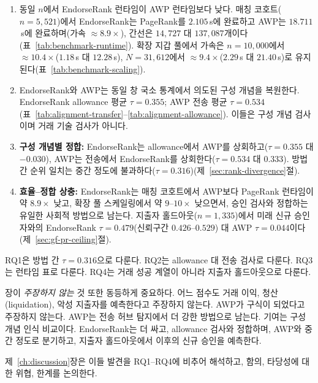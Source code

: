 \begin{enumerate}
\item[\textbf{C1.}] 동일 $n$에서 EndorseRank 런타임이 AWP 런타임보다 낮다. 매칭 코호트($n=5{,}521$)에서 EndorseRank는 PageRank를 $2.105$\,s에 완료하고 AWP는 $18.711$\,s에 완료하며(가속 $\approx 8.9\times$), 간선은 $14{,}727$ 대 $137{,}087$개이다(표~\ref{tab:benchmark-runtime}). 확장 지갑 풀에서 가속은 $n=10{,}000$에서 $\approx 10.4\times$($1.18$\,s 대 $12.28$\,s), $N=31{,}612$에서 $\approx 9.4\times$($2.29$\,s 대 $21.40$\,s)로 유지된다(표~\ref{tab:benchmark-scaling}).

\item[\textbf{C2.}] EndorseRank와 AWP는 동일 창 국소 통계에서 의도된 구성 개념을 복원한다. EndorseRank allowance 평균 $\tau=0.355$; AWP 전송 평균 $\tau=0.534$(표~\ref{tab:alignment-transfer}--\ref{tab:alignment-allowance}). 이들은 구성 개념 검사이며 거래 기술 검사가 아니다.

\item[\textbf{C3.}] \textbf{구성 개념별 정합:} EndorseRank는 allowance에서 AWP를 상회하고($\tau=0.355$ 대 $-0.030$), AWP는 전송에서 EndorseRank를 상회한다($\tau=0.534$ 대 $0.333$). 방법 간 순위 일치는 중간 정도에 불과하다($\tau=0.316$)(제~\ref{sec:rank-divergence}절).

\item[\textbf{C4.}] \textbf{효율--정합 상충:} EndorseRank는 매칭 코호트에서 AWP보다 PageRank 런타임이 약 $8.9\times$ 낮고, 확장 풀 스케일링에서 약 $9$--$10\times$ 낮으면서, 승인 검사와 정합하는 유일한 사회적 방법으로 남는다. 지출자 홀드아웃($n=1{,}335$)에서 미래 신규 승인자와의 EndorseRank $\tau=0.479$(신뢰구간 $0.426$--$0.529$) 대 AWP $\tau=0.044$이다(제~\ref{sec:gf-pr-ceiling}절).
\end{enumerate}

RQ1은 방법 간 $\tau=0.316$으로 다룬다. RQ2는 allowance 대 전송 검사로 다룬다. RQ3는 런타임 표로 다룬다. RQ4는 거래 성공 계열이 아니라 지출자 홀드아웃으로 다룬다.

장이 \emph{주장하지 않는} 것 또한 동등하게 중요하다. 어느 점수도 거래 이익, 청산(liquidation), 악성 지출자를 예측한다고 주장하지 않는다. AWP가 구식이 되었다고 주장하지 않는다. AWP는 전송 허브 탐지에서 더 강한 방법으로 남는다. 기여는 구성 개념 인식 비교이다. EndorseRank는 더 싸고, allowance 검사와 정합하며, AWP와 중간 정도로 분기하고, 지출자 홀드아웃에서 이후의 신규 승인을 예측한다.

제~\ref{ch:discussion}장은 이들 발견을 RQ1--RQ4에 비추어 해석하고, 함의, 타당성에 대한 위협, 한계를 논의한다.
